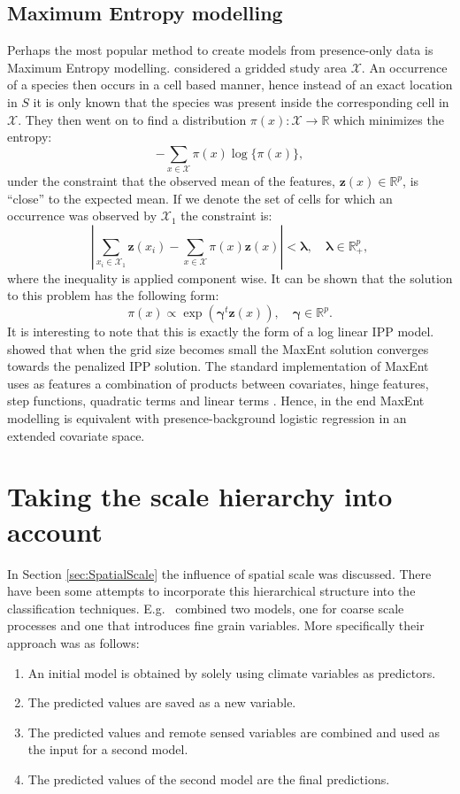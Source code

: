 \subsection{Maximum Entropy modelling}
\label{sec:MaximumEntropyModeling}
Perhaps the most popular method to create models from presence-only data is Maximum Entropy modelling. \cite{phillips_maximum_2006} considered a gridded study area $\mathcal{X}$. An occurrence of a species then occurs in a cell based manner, hence instead of an exact location in $S$ it is only known that the species was present inside the corresponding cell in $\mathcal{X}$. They then went on to find a distribution $\pi(x): \mathcal{X} \to \mathbb{R}$ which minimizes the entropy: 
\[ - \sum_{x\in\mathcal{X}} \pi(x) \log \{\pi(x)\},  \]
under the constraint that the observed mean of the features, $\bm{z}(x) \in \mathbb{R}^p$, is ``close'' to the expected mean. If we denote the set of cells for which an occurrence was observed by $\mathcal{X}_1$ the constraint is:
\[\left| \sum_{x_i \in \mathcal{X}_1} \bm{z}(x_i)  - \sum_{x \in \mathcal{X}} \pi(x)\bm{z}(x) \right| < \bm{\lambda}, \quad \bm{\lambda} \in \mathbb{R}^p_+,\]
where the inequality is applied component wise. It can be shown that the solution to this problem has the following form:
\[\pi(x) \propto \exp (\bm{\gamma}^t\bm{z}(x)), \quad \bm{\gamma} \in \mathbb{R}^p.\]
It is interesting to note that this is exactly the form of a log linear IPP model. \cite{renner_equivalence_2013} showed that when the grid size becomes small the MaxEnt solution converges towards the penalized IPP solution. The standard implementation of MaxEnt uses as features a combination of products between covariates, hinge features, step functions, quadratic terms and linear terms \parencite{phillips_modeling_2008}. Hence, in the end MaxEnt modelling is equivalent with presence-background logistic regression in an extended covariate space. \\

\section{Taking the scale hierarchy into account}
\label{sec:TakingTheScaleHierarchyIntoAccount}
In Section \ref{sec:SpatialScale} the influence of spatial scale was discussed. There have been some attempts to incorporate this hierarchical structure into the classification techniques. E.g.\ \cite{pearson_modelling_2004} combined two models, one for coarse scale processes and one that introduces fine grain variables. More specifically their approach was as follows: \\
\begin{enumerate}
\item An initial model is obtained by solely using climate variables as predictors.
\item The predicted values are saved as a new variable.
\item The predicted values and remote sensed variables are combined and used as the input for a second model.
\item The predicted values of the second model are the final predictions.
\end{enumerate}

